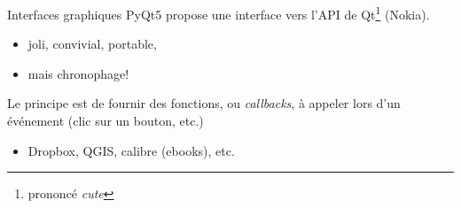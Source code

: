 \documentclass[dvipsnames]{beamer}
\begin{document}
\begin{frame}
    [fragile]{Interfaces graphiques}
    \alert{PyQt5} propose une interface vers l'API de Qt\footnote{prononcé
        \emph{cute}} (Nokia).
    \begin{itemize}
        \item joli, convivial, portable,
        \item mais chronophage!
    \end{itemize}
    Le principe est de fournir des fonctions, ou \emph{callbacks}, à appeler
    lors d'un événement (clic sur un bouton, etc.)

    \begin{itemize}
        \item Dropbox, QGIS, calibre (ebooks), etc.
    \end{itemize}
\end{frame}


\end{document}
